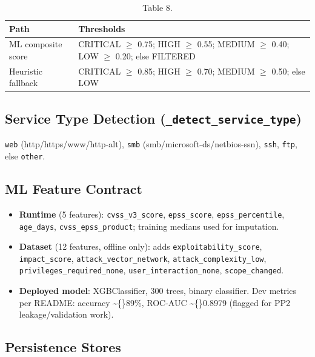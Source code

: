 \documentclass[10pt,journal,onecolumn]{IEEEtran}
\begin{document}
\begin{table}[h]
\caption{Table 8.}
\label{tab:t8}
\begin{tabularx}{\columnwidth}{l >{\raggedright\arraybackslash}X}
\toprule
\textbf{Path} & \textbf{Thresholds}\\
\midrule
ML composite score & CRITICAL $\geq$ 0.75; HIGH $\geq$ 0.55; MEDIUM $\geq$ 0.40; LOW $\geq$ 0.20; else FILTERED\\
Heuristic fallback & CRITICAL $\geq$ 0.85; HIGH $\geq$ 0.70; MEDIUM $\geq$ 0.50; else LOW\\
\bottomrule
\end{tabularx}
\end{table}

\subsection{Service Type Detection (\texttt{\_detect\_service\_type})}

\texttt{web} (http/https/www/http-alt), \texttt{smb} (smb/microsoft-ds/netbios-ssn), \texttt{ssh}, \texttt{ftp}, else \texttt{other}.

\subsection{ML Feature Contract}

\begin{itemize}
\item \textbf{Runtime} (5 features): \texttt{cvss\_v3\_score}, \texttt{epss\_score}, \texttt{epss\_percentile}, \texttt{age\_days}, \texttt{cvss\_epss\_product}; training medians used for imputation.
\item \textbf{Dataset} (12 features, offline only): adds \texttt{exploitability\_score}, \texttt{impact\_score}, \texttt{attack\_vector\_network}, \texttt{attack\_complexity\_low}, \texttt{privileges\_\allowbreak required\_\allowbreak none}, \texttt{user\_interaction\_none}, \texttt{scope\_changed}.
\item \textbf{Deployed model}: XGBClassifier, 300 trees, binary classifier. Dev metrics per README: accuracy \textasciitilde\{\}89\%, ROC-AUC \textasciitilde\{\}0.8979 (flagged for PP2 leakage/validation work).
\end{itemize}

\subsection{Persistence Stores}
\end{document}
